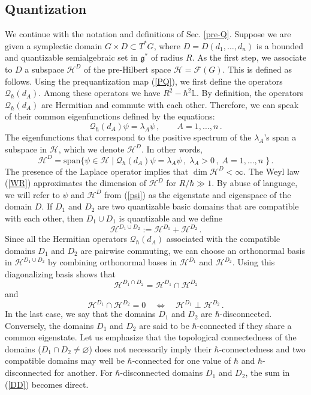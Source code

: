 \documentclass[12pt,a4paper]{article}
\numberwithin{equation}{section}
\theoremstyle{theorem}
\theoremstyle{remark}
\newcommand{\hh}{\mathcal{H}}
\newcommand{\fg}{\mathcal{F}(G)}
\newcommand{\gs}{\mathfrak{g}^\ast}
\newcommand{\qq}{\mathcal{Q}_{\hbar}}
\begin{document}
\subsection{Quantization}

We continue with the notation and definitions of Sec. \ref{pre-Q}. Suppose we are given a symplectic domain 
$G\times D\subset T^\ast G$, where  $D=D(d_1,\ldots, d_n)$ is a bounded and quantizable semialgebraic set in $\gs$ of radius $R$.  As the first step, we associate to $D$ a subspace $\hh^D$ of the pre-Hilbert space $\hh=\fg$. This is defined as follows. Using the prequantization map (\ref{PQ}), we first define the operators $\qq(d_A)$. Among these operators we have $R^2 -\hbar^2\mathbb{L}$. 
By definition, the operators $\qq(d_A)$ are Hermitian and commute with each other. Therefore, we can speak of their common eigenfunctions defined by the equations:
$$
\qq(d_A)\psi=\lambda_A\psi\,,\qquad A=1,\ldots, n\,.
$$
The eigenfunctions that correspond to the positive spectrum of the $\lambda_A$'s span a subspace in $\hh$, which we denote $\hh^D$. In other words,
\begin{equation}\label{psi}
\hh^D=\mathrm{span}\big\{\psi \in \hh\;|\;\qq(d_A)\psi=\lambda_A\psi\,, \; \lambda_A>0\,,\;A=1,\ldots,n\;\big\} \,.
\end{equation}
The presence of the Laplace operator implies that $\dim \hh^D <\infty$. The Weyl law (\ref{WR}) approximates the dimension of $\hh^D$ for $R/\hbar\gg 1$. By abuse of language, we will refer to $\psi$ and $\hh^D$ from (\ref{psi}) as the eigenstate and eigenspace of the domain $D$. If $D_1$ and $D_2$ are two quantizable basic domains that are compatible with each other,  then $D_1\cup D_1$ is quantizable and we define
\begin{equation}\label{DD}
 \hh^{D_1\cup D_2}:=\hh^{D_1}+\hh^{D_2}\,.
\end{equation}
Since all the Hermitian operators $\qq(d_A)$ associated with the compatible domains $D_1$ and $D_2$ are pairwise commuting, we can choose an orthonormal basis in $\hh^{D_1\cup D_2}$ by combining  orthonormal bases in $\hh^{D_1}$ and $\hh^{D_2}$.   Using this diagonalizing basis shows that 
$$
\hh^{D_1\cap D_2}=\hh^{D_1}\cap\hh^{D_2} 
$$
and 
$$
\hh^{D_1}\cap\hh^{D_2}=0\quad \Longleftrightarrow\quad \hh^{D_1}\perp\hh^{D_2}\,.
$$
In the last case, we say that the domains $D_1$ and $D_2$ are $\hbar$-disconnected. Conversely, the domains $D_1$  and $D_2$ are said to be $\hbar$-connected if they share a common eigenstate. Let us emphasize that the topological connectedness of the domains ($D_1\cap D_2\neq \varnothing$) does not necessarily imply their $\hbar$-connectedness and two compatible domains may well be $\hbar$-connected for one value of $\hbar$ and $\hbar$-disconnected for another.  For $\hbar$-disconnected domains $D_1$ and $D_2$, the sum in (\ref{DD}) becomes direct. 
\end{document}
